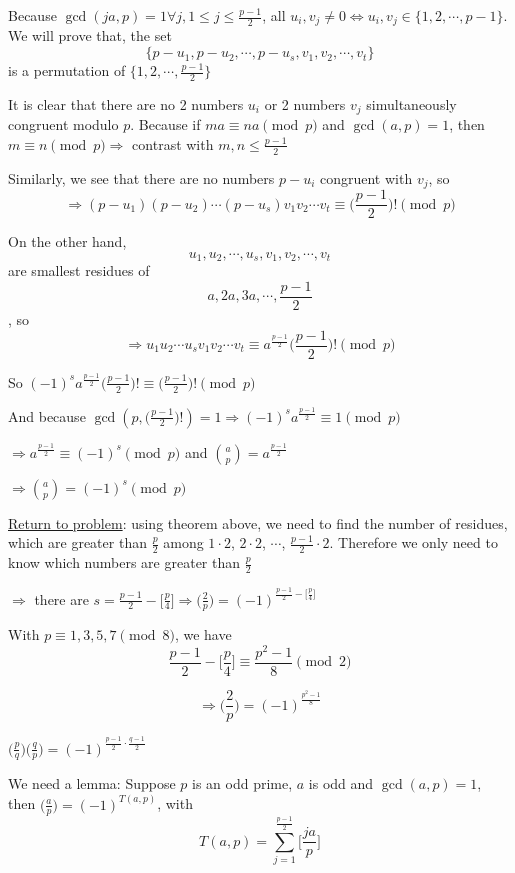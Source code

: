		Because $\gcd(ja, p)=1 \forall j, 1 \leq j \leq \frac{p-1}{2}$, all $u_i, v_j \neq 0 \Leftrightarrow u_i, v_j \in \{1,2,\cdots,p-1\}$. We will prove that, the set 
		\[\{p-u_1, p-u_2, \cdots, p-u_s, v_1, v_2, \cdots, v_t\}\] 
		is a permutation of $\{1,2,\cdots,\frac{p-1}{2}\}$
		
		It is clear that there are no 2 numbers $u_i$ or 2 numbers $v_j$ simultaneously congruent modulo $p$. Because if $ma \equiv na \pmod p$ and $\gcd(a,p)=1$, then $m\equiv n \pmod p \Rightarrow$ contrast with $m,n \leq \frac{p-1}{2}$
		
		Similarly, we see that there are no numbers $p-u_i$ congruent with $v_j$, so $$\Rightarrow (p-u_1)(p-u_2)\cdots(p-u_s)v_1 v_2 \cdots v_t \equiv \Big(\frac{p-1}{2}\Big)! \pmod p$$
		
		On the other hand, 
		\[u_1,u_2,\cdots,u_s, v_1, v_2, \cdots, v_t\] 
		are smallest residues of 
		\[a, 2a, 3a, \cdots, \frac{p-1}{2}\], so 
		\[\Rightarrow u_1 u_2 \cdots u_s v_1 v_2 \cdots v_t \equiv a^{\frac{p-1}{2}} \Big(\frac{p-1}{2}\Big)! \pmod p\]
		
		So $(-1)^s a^{\frac{p-1}{2}} \Big(\frac{p-1}{2}\Big)! \equiv \Big(\frac{p-1}{2}\Big)! \pmod p$
		
		And because $\gcd(p, \Big(\frac{p-1}{2}\Big)!) = 1 \Rightarrow (-1)^s a^{\frac{p-1}{2}} \equiv 1 \pmod p$
		
		$\Rightarrow a^{\frac{p-1}{2}} \equiv (-1)^s \pmod p$ and $\binom{a}{p} = a^{\frac{p-1}{2}}$
		
		$\Rightarrow \binom{a}{p} = (-1)^s \pmod p$
		
		\underline{Return to problem}: using theorem above, we need to find the number of residues, which are greater than $\frac{p}{2}$ among $1 \cdot 2$, $2 \cdot 2$, $\cdots$, $\frac{p-1}{2} \cdot 2$. Therefore we only need to know which numbers are greater than $\frac{p}{2}$
		
		$\Rightarrow$ there are $s = \frac{p-1}{2} - \Big[\frac{p}{4}\Big] \Rightarrow \Big(\frac{2}{p}\Big) = (-1)^{\frac{p-1}{2} - \Big[\frac{p}{4}\Big] }$
		
		With $p \equiv 1, 3, 5, 7 \pmod 8$, we have 
		\[\frac{p-1}{2} - \Big[\frac{p}{4}\Big] \equiv \frac{p^2-1}{8} \pmod 2\] 
		
		\[\Rightarrow \Big(\frac{2}{p}\Big) = (-1)^{\frac{p^2-1}{8}}\]

		 $\Big(\frac{p}{q}\Big)\Big(\frac{q}{p}\Big) = (-1)^{\frac{p-1}{2} \cdot \frac{q-1}{2}}$
		
		We need a lemma: Suppose $p$ is an odd prime, $a$ is odd and $\gcd(a, p) = 1$, then $\Big(\frac{a}{p}\Big) = (-1)^{T(a, p)}$, with 
		\[T(a, p) = \sum_{j=1}^{\frac{p-1}{2}}\Big[\frac{ja}{p}\Big]\]
		
